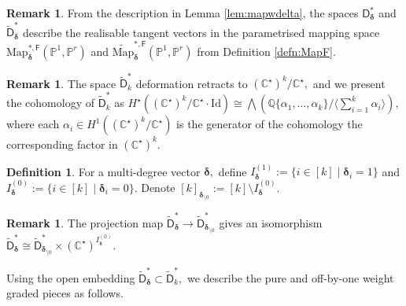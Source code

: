 \documentclass[12pt,reqno]{amsart}
\theoremstyle{definition}
\theoremstyle{definition}
\theoremstyle{definition}
\theoremstyle{definition}
\newtheorem{remark}[theorem]{Remark}
\newtheorem{definition}[theorem]{Definition}
\begin{document}
\begin{remark}
  From the description in Lemma \ref{lem:mapwdelta}, the spaces $\mathsf{D}^*_{\boldsymbol{\delta}}$ and ${\widetilde{\mathsf{D}}}^*_{\boldsymbol{\delta}}$ describe the realisable tangent vectors in the parametrised mapping space $\mathrm{Map}_{\boldsymbol{\delta}}^{*, \mathsf{F}}(\mathbb{P}^1, \mathbb{P}^r)$ and $\widetilde{\mathrm{Map}}_{\boldsymbol{\delta}}^{*, \mathsf{F}}(\mathbb{P}^1, \mathbb{P}^r)$ from Definition \ref{defn:MapF}.
\end{remark}

\begin{remark}
  The space $\widetilde{\mathsf{D}}_k^*$ deformation retracts to $(\mathbb{C}^\star)^k/\mathbb{C}^\star,$ and we present the cohomology of \(\widetilde{\mathsf{D}}_k^*\) as $H^\star((\mathbb{C}^\star)^{k}/\mathbb{C}^\star\cdot \mathrm{Id})\cong \bigwedge \left(\mathbb{Q}\{\alpha_1,\dots, \alpha_k\}/\langle\sum_{i=1}^k
  \alpha_i\rangle\right),$ where each $\alpha_i\in H^1((\mathbb{C}^\star)^{k}/\mathbb{C}^\star)$ is the generator of the cohomology the corresponding factor in $(\mathbb{C}^\star)^{k}.$
\end{remark}

\begin{definition}
  For a multi-degree vector $\boldsymbol{\delta},$ define $I_{\boldsymbol{\delta}}^{(1)}:=\{i\in [k]\mid \boldsymbol{\delta}_i = 1\}$ and $I_{\boldsymbol{\delta}}^{(0)}:=\{i\in [k]\mid \boldsymbol{\delta}_i = 0\}.$ Denote $[k]_{\boldsymbol{\delta}_{\setminus 0}}:=[k]\setminus I_{\boldsymbol{\delta}}^{(0)}.$
\end{definition}

\begin{remark}\label{rem:minuszerodeg}
  The projection map $\widetilde{\mathsf{D}}^*_{\boldsymbol{\delta}}\to \widetilde{\mathsf{D}}^*_{\boldsymbol{\delta}_{\setminus 0}}$ gives an isomorphism $\widetilde{\mathsf{D}}^*_{\boldsymbol{\delta}}\cong \widetilde{\mathsf{D}}^*_{\boldsymbol{\delta}_{\setminus 0}}\times (\mathbb{C}^\star)^{I_{\boldsymbol{\delta}}^{(0)}}.$
\end{remark}

Using the open embedding $\widetilde{\mathsf{D}}^*_{\boldsymbol{\delta}}\subset \widetilde{\mathsf{D}}_k^*,$ we describe the pure and off-by-one weight graded pieces as follows.
\end{document}
